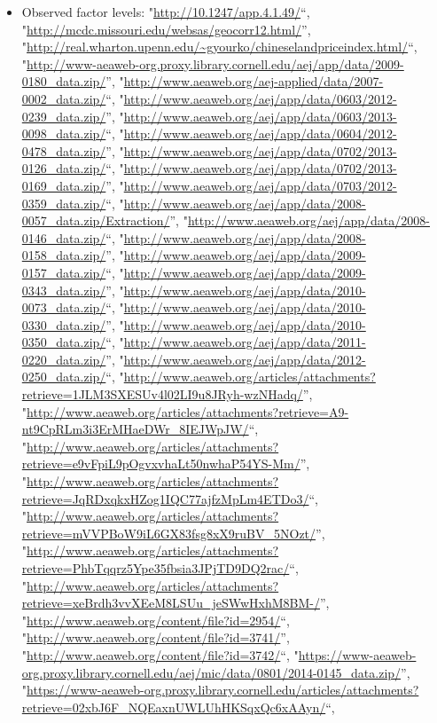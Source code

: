 \documentclass[]{article}
\providecommand{\tightlist}{%
  \setlength{\itemsep}{0pt}\setlength{\parskip}{0pt}}
\begin{document}
\begin{itemize}
\tightlist
\item
  Observed factor levels: "\url{http://10.1247/app.4.1.49/}``,
  "\url{http://mcdc.missouri.edu/websas/geocorr12.html/}'',
  "\url{http://real.wharton.upenn.edu/~gyourko/chineselandpriceindex.html/}``,
  "\url{http://www-aeaweb-org.proxy.library.cornell.edu/aej/app/data/2009-0180_data.zip/}'',
  "\url{http://www.aeaweb.org/aej-applied/data/2007-0002_data.zip/}``,
  "\url{http://www.aeaweb.org/aej/app/data/0603/2012-0239_data.zip/}'',
  "\url{http://www.aeaweb.org/aej/app/data/0603/2013-0098_data.zip/}``,
  "\url{http://www.aeaweb.org/aej/app/data/0604/2012-0478_data.zip/}'',
  "\url{http://www.aeaweb.org/aej/app/data/0702/2013-0126_data.zip/}``,
  "\url{http://www.aeaweb.org/aej/app/data/0702/2013-0169_data.zip/}'',
  "\url{http://www.aeaweb.org/aej/app/data/0703/2012-0359_data.zip/}``,
  "\url{http://www.aeaweb.org/aej/app/data/2008-0057_data.zip/Extraction/}'',
  "\url{http://www.aeaweb.org/aej/app/data/2008-0146_data.zip/}``,
  "\url{http://www.aeaweb.org/aej/app/data/2008-0158_data.zip/}'',
  "\url{http://www.aeaweb.org/aej/app/data/2009-0157_data.zip/}``,
  "\url{http://www.aeaweb.org/aej/app/data/2009-0343_data.zip/}'',
  "\url{http://www.aeaweb.org/aej/app/data/2010-0073_data.zip/}``,
  "\url{http://www.aeaweb.org/aej/app/data/2010-0330_data.zip/}'',
  "\url{http://www.aeaweb.org/aej/app/data/2010-0350_data.zip/}``,
  "\url{http://www.aeaweb.org/aej/app/data/2011-0220_data.zip/}'',
  "\url{http://www.aeaweb.org/aej/app/data/2012-0250_data.zip/}``,
  "\url{http://www.aeaweb.org/articles/attachments?retrieve=1JLM3SXESUv4l02LI9u8JRyh-wzNHadq/}'',
  "\url{http://www.aeaweb.org/articles/attachments?retrieve=A9-nt9CpRLm3i3ErMHaeDWr_8IEJWpJW/}``,
  "\url{http://www.aeaweb.org/articles/attachments?retrieve=e9vFpiL9pOgvxvhaLt50nwhaP54YS-Mm/}'',
  "\url{http://www.aeaweb.org/articles/attachments?retrieve=JqRDxqkxHZog1IQC77ajfzMpLm4ETDo3/}``,
  "\url{http://www.aeaweb.org/articles/attachments?retrieve=mVVPBoW9iL6GX83fsg8xX9ruBV_5NOzt/}'',
  "\url{http://www.aeaweb.org/articles/attachments?retrieve=PhbTqqrz5Ype35fbsia3JPjTD9DQ2rac/}``,
  "\url{http://www.aeaweb.org/articles/attachments?retrieve=xeBrdh3vvXEeM8LSUu_jeSWwHxhM8BM-/}'',
  "\url{http://www.aeaweb.org/content/file?id=2954/}``,
  "\url{http://www.aeaweb.org/content/file?id=3741/}'',
  "\url{http://www.aeaweb.org/content/file?id=3742/}``,
  "\url{https://www-aeaweb-org.proxy.library.cornell.edu/aej/mic/data/0801/2014-0145_data.zip/}'',
  "\url{https://www-aeaweb-org.proxy.library.cornell.edu/articles/attachments?retrieve=02xbJ6F_NQEaxnUWLUhHKSqxQc6xAAyn/}``,

\end{itemize}
\end{document}
